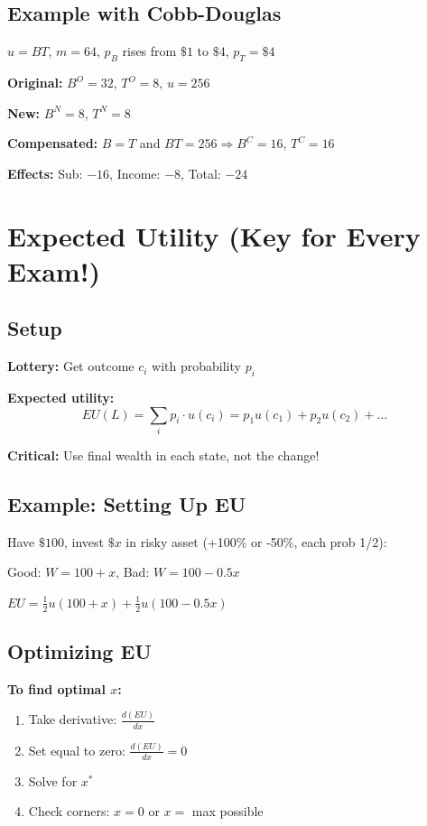 \documentclass[10pt,landscape]{article}
\begin{document}
\begin{multicols}{3}
\subsection{Example with Cobb-Douglas}
$u = BT$, $m=64$, $p_B$ rises from $\$1$ to $\$4$, $p_T = \$4$

\textbf{Original:} $B^O = 32$, $T^O = 8$, $u = 256$

\textbf{New:} $B^N = 8$, $T^N = 8$

\textbf{Compensated:} $B = T$ and $BT = 256 \Rightarrow B^C = 16$, $T^C = 16$

\textbf{Effects:} Sub: $-16$, Income: $-8$, Total: $-24$

\section{Expected Utility (Key for Every Exam!)}

\subsection{Setup}
\textbf{Lottery:} Get outcome $c_i$ with probability $p_i$

\textbf{Expected utility:}
$$EU(L) = \sum_{i} p_i \cdot u(c_i) = p_1 u(c_1) + p_2 u(c_2) + \ldots$$

\textbf{Critical:} Use final wealth in each state, not the change!

\subsection{Example: Setting Up EU}
Have $\$100$, invest $\$x$ in risky asset (+100\% or -50\%, each prob 1/2):

Good: $W = 100 + x$, Bad: $W = 100 - 0.5x$

$EU = \frac{1}{2}u(100+x) + \frac{1}{2}u(100-0.5x)$

\subsection{Optimizing EU}
\textbf{To find optimal $x$:}
\begin{enumerate}[leftmargin=*,noitemsep,topsep=0pt]
\item Take derivative: $\frac{d(EU)}{dx}$
\item Set equal to zero: $\frac{d(EU)}{dx} = 0$
\item Solve for $x^*$
\item Check corners: $x = 0$ or $x = $ max possible
\end{enumerate}


\end{multicols}
\end{document}

